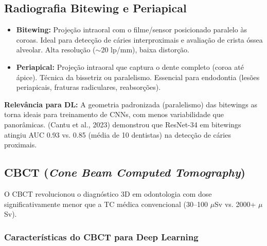 
\subsection{Radiografia Bitewing e Periapical}

\begin{itemize}
  \item \textbf{Bitewing:} Projeção intraoral com o filme/sensor posicionado
        paralelo às coroas. Ideal para detecção de cáries interproximais e
        avaliação de crista óssea alveolar. Alta resolução ($\sim$20 lp/mm),
        baixa distorção.
  \item \textbf{Periapical:} Projeção intraoral que captura o dente completo
        (coroa até ápice). Técnica da bissetriz ou paralelismo. Essencial para
        endodontia (lesões periapicais, fraturas radiculares, reabsorções).
\end{itemize}

\textbf{Relevância para DL:} A geometria padronizada (paralelismo) das bitewings
as torna ideais para treinamento de CNNs, com menos variabilidade que panorâmicas.
 (Cantu et al., 2023) demonstrou que ResNet-34 em bitewings
atingiu AUC 0.93 vs. 0.85 (média de 10 dentistas) na detecção de cáries proximais.

\subsection{CBCT (\textit{Cone Beam Computed Tomography})}

O CBCT revolucionou o diagnóstico 3D em odontologia com dose significativamente
menor que a TC médica convencional (30--100 $\mu$Sv vs. 2000+ $\mu$Sv).

\subsubsection{Características do CBCT para Deep Learning}

